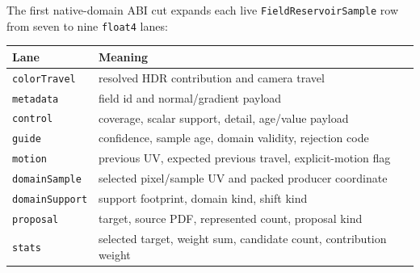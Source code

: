 \documentclass[11pt]{article}
\begin{document}
The first native-domain ABI cut expands each live \texttt{FieldReservoirSample}
row from seven to nine \texttt{float4} lanes:

\begin{center}
\begin{tabular}{ll}
\toprule
Lane & Meaning \\
\midrule
\texttt{colorTravel} & resolved HDR contribution and camera travel \\
\texttt{metadata} & field id and normal/gradient payload \\
\texttt{control} & coverage, scalar support, detail, age/value payload \\
\texttt{guide} & confidence, sample age, domain validity, rejection code \\
\texttt{motion} & previous UV, expected previous travel, explicit-motion flag \\
\texttt{domainSample} & selected pixel/sample UV and packed producer coordinate \\
\texttt{domainSupport} & support footprint, domain kind, shift kind \\
\texttt{proposal} & target, source PDF, represented count, proposal kind \\
\texttt{stats} & selected target, weight sum, candidate count, contribution weight \\
\bottomrule
\end{tabular}
\end{center}
\end{document}
